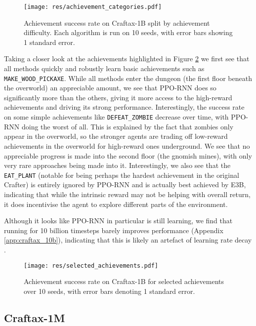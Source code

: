 \documentclass{article}
\theoremstyle{plain}
\theoremstyle{definition}
\theoremstyle{remark}
\begin{document}
\begin{figure}
    \centering
    \texttt{[image: res/achievement\_categories.pdf]}
    \caption{Achievement success rate on Craftax-1B split by achievement difficulty.  Each algorithm is run on 10 seeds, with error bars showing 1 standard error.}
    \label{fig:achievements_1b}
\end{figure}

Taking a closer look at the achievements highlighted in Figure \ref{fig:selected_achievements_1b} we first see that all methods quickly and robustly learn basic achievements such as \texttt{MAKE\_WOOD\_PICKAXE}.  While all methods enter the dungeon (the first floor beneath the overworld) an appreciable amount, we see that PPO-RNN does so significantly more than the others, giving it more access to the high-reward achievements and driving its strong performance.  Interestingly, the success rate on some simple achievements like \texttt{DEFEAT\_ZOMBIE} decrease over time, with PPO-RNN doing the worst of all.  This is explained by the fact that zombies only appear in the overworld, so the stronger agents are trading off low-reward achievements in the overworld for high-reward ones underground.  We see that no appreciable progress is made into the second floor (the gnomish mines), with only very rare approaches being made into it.  Interestingly, we also see that the \texttt{EAT\_PLANT} (notable for being perhaps the hardest achievement in the original Crafter) is entirely ignored by PPO-RNN and is actually best achieved by E3B, indicating that while the intrinsic reward may not be helping with overall return, it does incentivise the agent to explore different parts of the environment.

Although it looks like PPO-RNN in particular is still learning, we find that running for 10 billion timesteps barely improves performance (Appendix \ref{app:craftax_10b}), indicating that this is likely an artefact of learning rate decay \citep{you2019does}.

\begin{figure}
    \centering
    \texttt{[image: res/selected\_achievements.pdf]}
    \caption{Achievement success rate on Craftax-1B for selected achievements over 10 seeds, with error bars denoting 1 standard error.}
    \label{fig:selected_achievements_1b}
\end{figure}

\subsection{Craftax-1M} \label{sec:craftax_1m}
\end{document}
